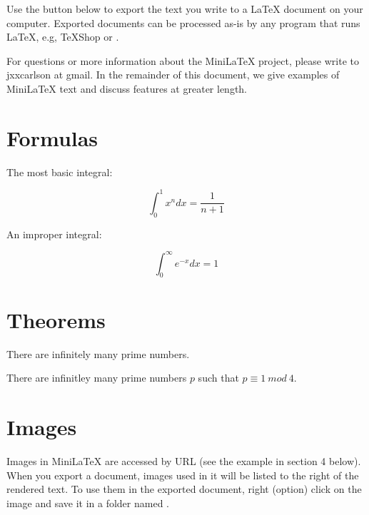  Use the  button below to export the text you write to a
LaTeX document on your computer. Exported documents can
be processed as-is by any program that runs LaTeX,
e.g, TeXShop or .


For questions or more information about
the MiniLaTeX project, please  write to jxxcarlson at gmail.  In the remainder of this document, we give examples of MiniLaTeX text and discuss features at greater length.

\section{Formulas}


The most basic integral:

\begin{equation}
\label{integral:xn}
\int_0^1 x^n dx = \frac{1}{n+1}
\end{equation}

An improper integral:

\begin{equation}
\label{integral:exp}
\int_0^\infty e^{-x} dx = 1
\end{equation}

\section{Theorems}

\begin{theorem}
There are infinitely many prime numbers.
\end{theorem}

\begin{theorem}
There are infinitley many prime numbers
$p$ such that $p \equiv 1\ mod\ 4$.
\end{theorem}

\section{Images}

Images in MiniLaTeX are accessed by URL (see the example
in section 4 below). When you export a document, images
used in it will be listed to the right
of the rendered text.  To use them in the exported
document, right (option) click on the image and
save it in a folder named .


